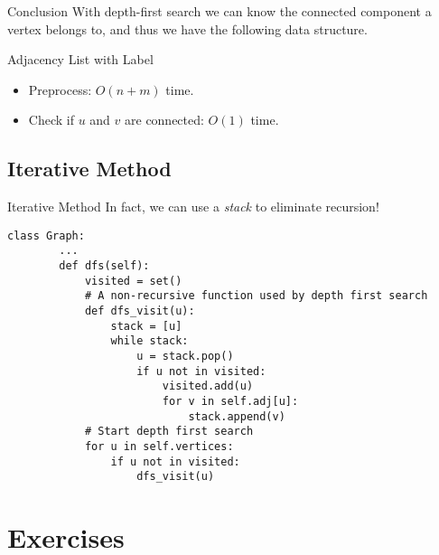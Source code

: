 \documentclass{beamer}
\begin{document}
\begin{frame}{Conclusion}
  With depth-first search we can know the connected component a vertex belongs
  to, and thus we have the following data structure. \pause
  \begin{block}{Adjacency List with Label}
    \begin{itemize}
      \item Preprocess: $O(n + m)$ time.
      \item Check if $u$ and $v$ are {\color{red} connected}: $O(1)$ time.
    \end{itemize}
  \end{block}
\end{frame}

\subsection{Iterative Method}
\begin{frame}[fragile]{Iterative Method}
  In fact, we can use a \emph{stack} to eliminate recursion! \pause
  \begin{block}{}
    \scriptsize
    \begin{lstlisting}[gobble=4]
    class Graph:
        ...
        def dfs(self):
            visited = set()
            # A non-recursive function used by depth first search
            def dfs_visit(u):
                stack = [u]
                while stack:
                    u = stack.pop()
                    if u not in visited:
                        visited.add(u)
                        for v in self.adj[u]:
                            stack.append(v)
            # Start depth first search
            for u in self.vertices:
                if u not in visited:
                    dfs_visit(u)
    \end{lstlisting}
  \end{block}
\end{frame}

\section{Exercises}
\end{document}
